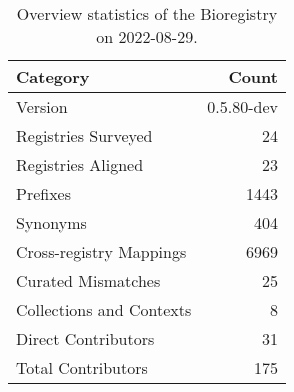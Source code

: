 \begin{table}
\centering
\caption{Overview statistics of the Bioregistry on 2022-08-29.}
\label{tab:bioregistry-summary}
\begin{tabular}{lr}
\toprule
                Category &      Count \\
\midrule
                 Version & 0.5.80-dev \\
     Registries Surveyed &         24 \\
      Registries Aligned &         23 \\
                Prefixes &       1443 \\
                Synonyms &        404 \\
 Cross-registry Mappings &       6969 \\
      Curated Mismatches &         25 \\
Collections and Contexts &          8 \\
     Direct Contributors &         31 \\
      Total Contributors &        175 \\
\bottomrule
\end{tabular}
\end{table}
